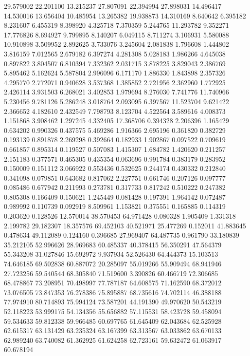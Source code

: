 29.579002
22.201100
13.215237
27.807091
22.394994
27.898031
14.496417
14.530016
13.656404
10.485954
13.265382
19.938873
14.310169
8.640642
6.395182
8.231607
6.455319
8.398920
4.325718
7.370359
5.244765
11.293782
9.352271
17.776826
8.694927
9.799895
8.140207
6.049115
8.711274
3.106931
5.580088
10.910898
3.509952
2.892625
3.733076
3.245604
2.081838
1.796608
1.444802
3.816159
7.012565
2.679182
6.397274
4.281308
5.028183
1.986266
4.645038
0.897822
3.804507
6.810394
7.332362
2.031715
3.878225
3.829043
2.386769
5.895462
5.162624
5.587804
2.996096
6.171170
1.886330
1.843898
2.357326
4.295770
2.772071
0.940628
3.537368
1.385852
2.721956
2.362960
1.772925
2.426114
3.931503
6.268021
3.402853
1.979694
8.276030
7.741776
11.740966
5.230456
9.781126
5.286248
3.018764
2.093095
6.397567
11.523704
9.621422
2.366652
4.182610
2.432549
7.798793
8.123704
4.522564
3.589616
4.008373
1.151868
3.908462
1.297245
4.332405
17.368706
0.394328
2.206396
1.165429
0.634202
0.990326
0.437575
5.469286
1.916366
2.695196
0.361820
0.382729
0.193139
0.891878
2.269298
0.392664
0.182933
1.902867
0.097522
0.709619
0.661857
0.895314
0.119527
0.507083
1.415307
1.684782
1.420620
0.211257
2.151183
0.377571
0.465305
0.435354
0.063696
0.991784
0.383179
0.283952
0.150009
0.151112
3.066922
0.553436
0.532625
0.244174
0.430332
0.212840
0.341098
0.079851
0.643682
0.817062
2.227751
0.661746
0.207126
0.097777
0.085486
0.677942
0.211993
0.273781
0.317733
0.817242
0.510222
0.247382
0.805308
0.166409
0.150621
1.245449
0.081428
0.197391
1.964142
0.072487
0.989992
0.110739
0.092919
8.509961
1.153821
0.375551
0.165885
0.114319
0.203620
0.128526
12.570014
38.570453
64.971428
0.080328
1.905409
1.331318
2.199782
29.182307
18.357576
69.452103
40.521971
25.477269
0.152011
41.883645
0.478634
49.112089
0.124160
0.396685
27.969407
64.487735
0.961790
33.180839
35.212105
52.996626
28.969683
60.485337
40.378415
56.350291
47.564379
55.343208
31.027846
15.692972
9.937934
52.526430
64.444373
15.103513
74.646185
69.502838
60.887072
20.285097
55.019266
55.909494
68.941946
27.723256
59.540544
68.305840
71.519600
3.390826
60.466719
72.306685
68.478867
73.208951
70.498997
77.787187
64.608575
71.162590
68.372012
73.076505
73.847353
76.278386
75.895887
68.735616
74.702114
46.388188
77.974910
80.714893
75.994124
73.587201
44.191390
49.970620
50.543219
52.118223
53.999175
54.134356
55.656882
57.115531
58.423728
59.458094
59.534633
59.812338
59.966485
60.697765
61.645409
62.043684
62.525928
62.615317
63.131429
63.235324
63.167399
63.313567
63.033862
63.670133
62.989240
63.740082
61.362925
61.624258
62.723161
59.632472
61.063917
60.678194
